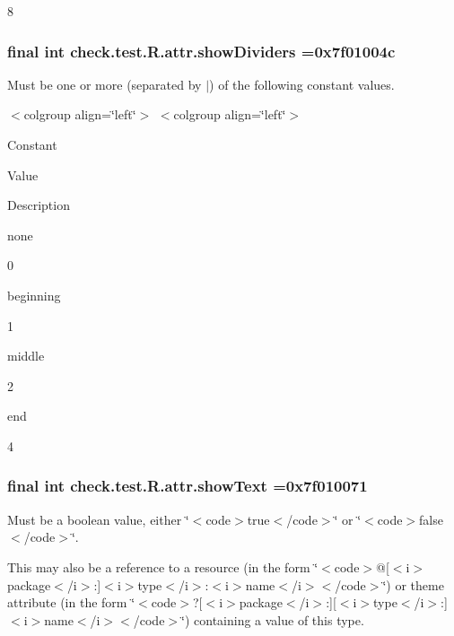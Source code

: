 8\hypertarget{classcheck_1_1test_1_1_r_1_1attr_a750aa097ff8cb566f4d3df74241890b9}{}
\subsubsection[{show\+Dividers}]{\setlength{\rightskip}{0pt plus 5cm}final int check.\+test.\+R.\+attr.\+show\+Dividers =0x7f01004c\hspace{0.3cm}{\ttfamily [static]}}\label{classcheck_1_1test_1_1_r_1_1attr_a750aa097ff8cb566f4d3df74241890b9}
Must be one or more (separated by \textquotesingle{}$\vert$\textquotesingle{}) of the following constant values.

\begin{TabularC}{0}
\hline
\end{TabularC}
$<$colgroup align=\char`\"{}left\char`\"{}$>$ $<$colgroup align=\char`\"{}left\char`\"{}$>$ 

Constant

Value

Description 

{\ttfamily none}

0

{\ttfamily beginning}

1

{\ttfamily middle}

2

{\ttfamily end}

4\hypertarget{classcheck_1_1test_1_1_r_1_1attr_af5f8b91a69d2e2925fc0a7c41a279669}{}
\subsubsection[{show\+Text}]{\setlength{\rightskip}{0pt plus 5cm}final int check.\+test.\+R.\+attr.\+show\+Text =0x7f010071\hspace{0.3cm}{\ttfamily [static]}}\label{classcheck_1_1test_1_1_r_1_1attr_af5f8b91a69d2e2925fc0a7c41a279669}
Must be a boolean value, either \char`\"{}$<$code$>$true$<$/code$>$\char`\"{} or \char`\"{}$<$code$>$false$<$/code$>$\char`\"{}. 

This may also be a reference to a resource (in the form \char`\"{}$<$code$>$@\mbox{[}$<$i$>$package$<$/i$>$\+:\mbox{]}$<$i$>$type$<$/i$>$\+:$<$i$>$name$<$/i$>$$<$/code$>$\char`\"{}) or theme attribute (in the form \char`\"{}$<$code$>$?\mbox{[}$<$i$>$package$<$/i$>$\+:\mbox{]}\mbox{[}$<$i$>$type$<$/i$>$\+:\mbox{]}$<$i$>$name$<$/i$>$$<$/code$>$\char`\"{}) containing a value of this type. \hypertarget{classcheck_1_1test_1_1_r_1_1attr_adf3a7eab0f546f495a660d306b9f17fd}{}
